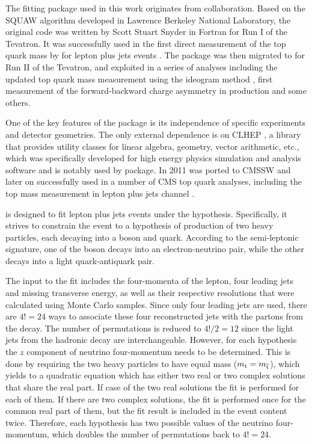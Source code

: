 The \HitFit fitting package \autocite{HitFit} used in this work originates from \Dzero collaboration. Based on the SQUAW
algorithm \autocite{SQUAW} developed in Lawrence Berkeley National Laboratory, the original \HitFit code was written by
Scott Stuart Snyder in Fortran for Run I of the Tevatron. It was successfully used in the first direct measurement of
the top quark mass by \Dzero for lepton plus jets \ttbar events \autocite{D0_top_mass_1998}. The package was then
migrated to \Cplusplus for Run II of the Tevatron, and exploited in a series of \ttbar analyses including the updated
top quark mass measurement using the ideogram method \autocite{D0_top_mass_ljets_ideogram}, first measurement of the
forward-backward charge asymmetry in \ttbar production \autocite{D0_charge_assymetry} and some others.

One of the key features of the \HitFit package is its independence of specific experiments and detector geometries. The
only external dependence is on \textsc{CLHEP} \autocite{CLHEP}, a \Cplusplus library that provides utility classes for
linear algebra, geometry, vector arithmetic, etc., which was specifically developed for high energy physics simulation
and analysis software and is notably used by \GEANTfour package. In 2011 \HitFit was ported to CMSSW and later on
successfully used in a number of CMS top quark analyses, including the top mass measurement in lepton plus jets channel
\autocite{top_mass_ljets_CMS}.

\HitFit is designed to fit lepton plus jets events under the \ttbar hypothesis. Specifically, it strives to constrain
the event to a hypothesis of production of two heavy particles, each decaying into a \W boson and \cPqb quark. According
to the semi-leptonic signature, one of the \W boson decays into an electron-neutrino pair, while the other decays into a
light quark-antiquark pair.

The input to the fit includes the four-momenta of the lepton, four leading jets and missing transverse energy, as well
as their respective resolutions that were calculated using Monte Carlo samples. Since only four leading jets are used,
there are $4!=24$ ways to associate these four reconstructed jets with the partons from the \ttbar decay. The number of
permutations is reduced to $4!/2=12$ since the light jets from the hadronic \W decay are interchangeable. However, for
each hypothesis the $z$ component of neutrino four-momentum needs to be determined. This is done by requiring the two
heavy particles to have equal mass ($m_{\mathrm{t}} = m_{\overline{\mathrm{t}}}$), which yields to a quadratic equation which has either two
real or two complex solutions that share the real part. If case of the two real solutions the fit is performed for each
of them. If there are two complex solutions, the fit is performed once for the common real part of them, but the fit
result is included in the event content twice. Therefore, each hypothesis has two possible values of the neutrino
four-momentum, which doubles the number of permutations back to $4!=24$.

